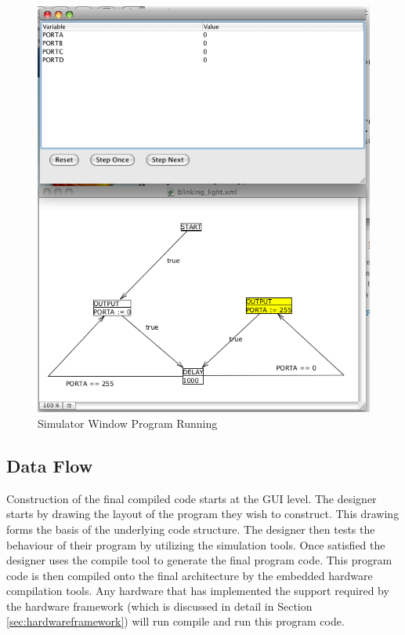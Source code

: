 \begin{figure}[htp]
    \centering
    \includegraphics[width=\imgmedium]{./images/plcedit_simulator_running.png}
    \caption{Simulator Window Program Running}
    \label{fig:plcedit_simulator_running}
\end{figure}





\subsection{Data Flow}

Construction of the final compiled code starts at the GUI level. The designer starts 
by drawing the layout of the program they wish to construct. This drawing forms 
the basis of the underlying code structure. The designer then tests the behaviour of 
their program by utilizing the simulation tools. Once satisfied the designer uses the 
compile tool to generate the final program code. This program code is then compiled onto 
the final architecture by the embedded hardware compilation tools. Any hardware that 
has implemented the support required by the hardware framework (which is discussed in 
detail in Section \ref{sec:hardwareframework}) will run compile and run this program code.

